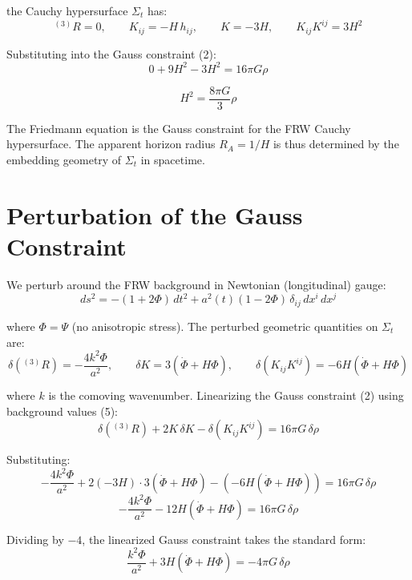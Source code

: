 \documentclass[12pt,a4paper]{article}
\begin{document}
the Cauchy hypersurface $\Sigma_t$ has:
\begin{equation}
{}^{(3)}R = 0, \qquad K_{ij} = -H\,h_{ij}, \qquad K = -3H, \qquad K_{ij}K^{ij} = 3H^2 \tag{5}
\end{equation}

Substituting into the Gauss constraint (2):
\begin{equation}
0 + 9H^2 - 3H^2 = 16\pi G\rho \tag{6}
\end{equation}

\begin{equation}
\boxed{H^2 = \frac{8\pi G}{3}\rho} \tag{7}
\end{equation}

The Friedmann equation is the Gauss constraint for the FRW Cauchy hypersurface. The apparent horizon radius $R_A = 1/H$ is thus determined by the embedding geometry of $\Sigma_t$ in spacetime.

\section{Perturbation of the Gauss Constraint}

We perturb around the FRW background in Newtonian (longitudinal) gauge:
\begin{equation}
ds^2 = -(1+2\Phi)\,dt^2 + a^2(t)(1-2\Phi)\,\delta_{ij}\,dx^i\,dx^j \tag{8}
\end{equation}

where $\Phi = \Psi$ (no anisotropic stress). The perturbed geometric quantities on $\Sigma_t$ are:
\begin{equation}
\delta\!\left({}^{(3)}R\right) = -\frac{4k^2\Phi}{a^2}, \qquad \delta K = 3(\dot\Phi + H\Phi), \qquad \delta(K_{ij}K^{ij}) = -6H(\dot\Phi + H\Phi) \tag{9}
\end{equation}

where $k$ is the comoving wavenumber. Linearizing the Gauss constraint (2) using background values (5):
\begin{equation}
\delta\!\left({}^{(3)}R\right) + 2K\,\delta K - \delta(K_{ij}K^{ij}) = 16\pi G\,\delta\rho \tag{10}
\end{equation}

Substituting:
\[
-\frac{4k^2\Phi}{a^2} + 2(-3H)\cdot 3(\dot\Phi+H\Phi) - (-6H(\dot\Phi+H\Phi)) = 16\pi G\,\delta\rho
\]
\[
-\frac{4k^2\Phi}{a^2} - 12H(\dot\Phi+H\Phi) = 16\pi G\,\delta\rho
\]

Dividing by $-4$, the linearized Gauss constraint takes the standard form:
\begin{equation}
\frac{k^2\Phi}{a^2} + 3H(\dot\Phi + H\Phi) = -4\pi G\,\delta\rho \tag{11}
\end{equation}
\end{document}
